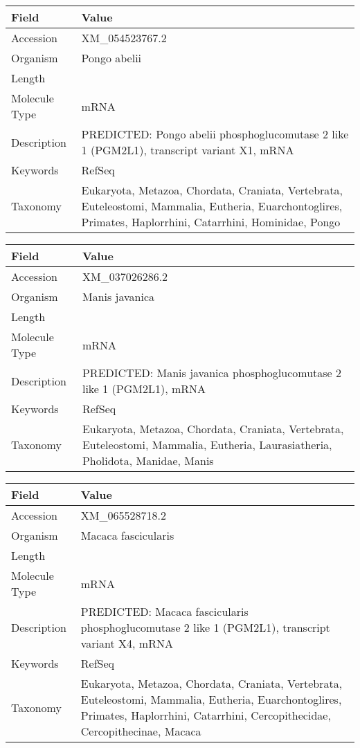 \documentclass[10pt]{article}
\begin{document}
{\footnotesize
\begin{longtable}{>{\raggedright\arraybackslash}p{4.5cm} >{\raggedright\arraybackslash}p{11.5cm}}
\textbf{Field} & \textbf{Value} \\
\hline
Accession & XM\_054523767.2 \\
Organism & Pongo abelii \\
Length & 7559 \\
Molecule Type & mRNA \\
Description & PREDICTED: Pongo abelii phosphoglucomutase 2 like 1 (PGM2L1), transcript variant X1, mRNA \\
Keywords & RefSeq \\
Taxonomy & Eukaryota, Metazoa, Chordata, Craniata, Vertebrata, Euteleostomi, Mammalia, Eutheria, Euarchontoglires, Primates, Haplorrhini, Catarrhini, Hominidae, Pongo \\
\end{longtable}
}

{\footnotesize
\begin{longtable}{>{\raggedright\arraybackslash}p{4.5cm} >{\raggedright\arraybackslash}p{11.5cm}}
\textbf{Field} & \textbf{Value} \\
\hline
Accession & XM\_037026286.2 \\
Organism & Manis javanica \\
Length & 8021 \\
Molecule Type & mRNA \\
Description & PREDICTED: Manis javanica phosphoglucomutase 2 like 1 (PGM2L1), mRNA \\
Keywords & RefSeq \\
Taxonomy & Eukaryota, Metazoa, Chordata, Craniata, Vertebrata, Euteleostomi, Mammalia, Eutheria, Laurasiatheria, Pholidota, Manidae, Manis \\
\end{longtable}
}

{\footnotesize
\begin{longtable}{>{\raggedright\arraybackslash}p{4.5cm} >{\raggedright\arraybackslash}p{11.5cm}}
\textbf{Field} & \textbf{Value} \\
\hline
Accession & XM\_065528718.2 \\
Organism & Macaca fascicularis \\
Length & 4109 \\
Molecule Type & mRNA \\
Description & PREDICTED: Macaca fascicularis phosphoglucomutase 2 like 1 (PGM2L1), transcript variant X4, mRNA \\
Keywords & RefSeq \\
Taxonomy & Eukaryota, Metazoa, Chordata, Craniata, Vertebrata, Euteleostomi, Mammalia, Eutheria, Euarchontoglires, Primates, Haplorrhini, Catarrhini, Cercopithecidae, Cercopithecinae, Macaca \\
\end{longtable}
}
\end{document}
